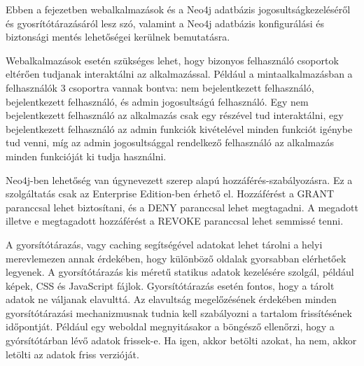 
Ebben a fejezetben webalkalmazások és a Neo4j adatbázis jogosultságkezeléséről és gyosrítótárazásáról lesz szó, valamint a Neo4j adatbázis konfigurálási és biztonsági mentés lehetőségei kerülnek bemutatásra.



Webalkalmazások esetén szükséges lehet, hogy bizonyos felhasználó csoportok eltérően tudjanak interaktálni az alkalmazással. Például a mintaalkalmazásban a felhasználók 3 csoportra vannak bontva: nem bejelentkezett felhasználó, bejelentkezett  felhasználó, és admin jogosultságú felhasználó. Egy nem bejelentkezett felhasználó az alkalmazás csak egy részével tud interaktálni, egy bejelentkezett felhasználó az admin funkciók kivételével minden funkciót igénybe tud venni, míg az admin jogosultsággal rendelkező felhasználó az alkalmazás minden funkcióját ki tudja használni.

\bigskip

Neo4j-ben lehetőség van úgynevezett szerep alapú hozzáférés-szabályozásra. \cite{neo4j-privileges} Ez a szolgáltatás csak az Enterprise Edition-ben érhető el. Hozzáférést a GRANT paranccsal lehet biztosítani, és a DENY paranccsal lehet megtagadni. A megadott illetve e megtagadott hozzáférést a REVOKE paranccsal lehet semmissé tenni. 


A gyorsítótárazás, vagy caching segítségével adatokat lehet tárolni a helyi merevlemezen annak érdekében, hogy különböző oldalak gyorsabban elérhetőek legyenek. \cite{cache} A gyorsítótárazás kis méretű statikus adatok kezelésére szolgál, például képek, CSS és JavaScript fájlok. Gyorsítótárazás esetén fontos, hogy a tárolt adatok ne váljanak elavulttá. Az elavultság megelőzésének érdekében minden gyorsítótárazási mechanizmusnak tudnia kell szabályozni a tartalom frissítésének időpontját. Például egy weboldal megnyitásakor a böngésző ellenőrzi, hogy a gyórsítótárban lévő adatok frissek-e. Ha igen, akkor betölti azokat, ha nem, akkor letölti az adatok friss verzióját.

